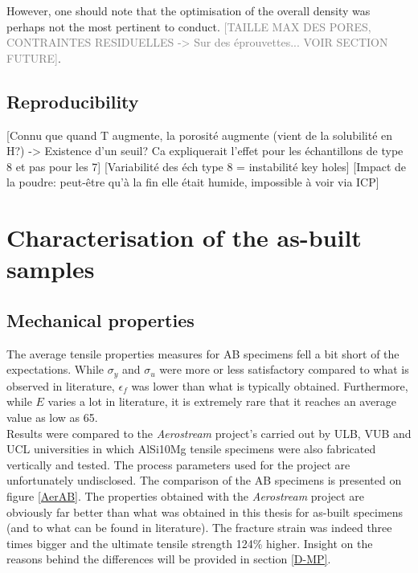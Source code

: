 However, one should note that the optimisation of the overall density was perhaps not the most pertinent to conduct. \textcolor{gray}{[TAILLE MAX DES PORES, CONTRAINTES RESIDUELLES -> Sur des éprouvettes... VOIR SECTION FUTURE]}.\\ 

\subsection{Reproducibility}

[Connu que quand T augmente, la porosité augmente (vient de la solubilité en H?) -> Existence d'un seuil? Ca expliquerait l'effet pour les échantillons de type 8 et pas pour les 7]
[Variabilité des éch type 8 = instabilité key holes]
[Impact de la poudre: peut-être qu'à la fin elle était humide, impossible à voir via ICP]

\section{Characterisation of the as-built samples}

\subsection{Mechanical properties}

The average tensile properties measures for AB specimens fell a bit short of the expectations. While $\sigma_y$ and $\sigma_u$ were more or less satisfactory compared to what is observed in literature, $\epsilon_f$ was lower than what is typically obtained. Furthermore, while $E$ varies a lot in literature, it is extremely rare that it reaches an average value as low as 65. \\

Results were compared to the \textit{Aerostream} project's carried out by ULB, VUB and UCL universities in which AlSi10Mg tensile specimens were also fabricated vertically and tested. The process parameters used for the project are unfortunately undisclosed. The comparison of the AB specimens is presented on figure \ref{AerAB}. The properties obtained with the \textit{Aerostream} project are obviously far better than what was obtained in this thesis for as-built specimens (and to what can be found in literature). The fracture strain was indeed three times bigger and the ultimate tensile strength 124\% higher. Insight on the reasons behind the differences will be provided in section \ref{D-MP}.

